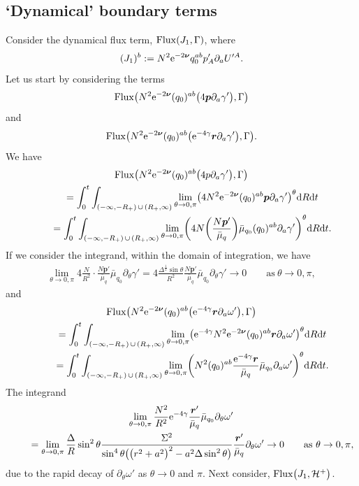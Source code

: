 \documentclass[pdftex]{sigma}
\def\ptl{\partial}%
\def\mbo#1{\boldsymbol{#1}}%
\def\halb{\frac{1}{2}}%
\numberwithin{equation}{section}
\begin{document}
\subsection*{`Dynamical' boundary terms}
Consider the dynamical flux term, ${\rm Flux} (J_1, \Gamma)$, where
\[
(J_1)^b := N^2 {\rm e}^{-2 \mbo{\nu}} q^{ab}_0 p'_A \ptl_a U'^A.
\]
Let us start by considering the terms
\[
{\rm Flux} \bigl(N^2 {\rm e}^{-2 \mbo{\nu}} (q_0)^{ab} \bigl(4 \mbo{p} \ptl_a \gamma' \bigr), \Gamma\bigr)
\]
 and
 \[
 {\rm Flux} \bigl(N^2 {\rm e}^{-2 \mbo{\nu}} (q_0)^{ab} \bigl({\rm e}^{-4 \gamma} \mbo{r} \ptl_a \gamma' \bigr), \Gamma\bigr).
 \]
We have
\begin{gather*}
{\rm Flux} \bigl(N^2 {\rm e}^{-2 \mbo{\nu}} (q_0)^{ab} \bigl(4p \ptl_a \gamma' \bigr), \Gamma\bigr) \\
\qquad{} = \int^t_0 \int_{ (-\infty, -R_+) \, \cup\, (R_+, \infty) } \lim_{\theta \to 0, \pi} \bigl(4 N^2 {\rm e}^{-2 \mbo{\nu}} (q_0)^{ab} \mbo{p} \ptl_a \gamma'\bigr)^\theta {\rm d}R {\rm d}t \notag\\
\qquad{}= \int^t_0 \int_{ (-\infty, -R_+) \, \cup\, (R_+, \infty) } \lim_{\theta \to 0, \pi} \biggl(4 N \biggl(\frac{ N\mbo{p}'}{\bar{\mu}_q} \biggr) \bar{\mu}_{q_0} (q_0)^{ab} \ptl_a \gamma' \biggr)^\theta {\rm d}R {\rm d}t. \notag
 \end{gather*}
If we consider the integrand, within the domain of integration, we have
 \begin{gather*}
 \lim_{\theta \to 0, \pi}4 \frac{N}{R^2} \cdot \frac{N \mbo{p}'}{\bar{\mu}_q} \bar{\mu}_{q_0} \ptl_\theta \gamma' = 4 \frac{\Delta^\halb \sin \theta}{R^2} \frac{N \mbo{p}'}{\bar{\mu}_q} \bar{\mu}_{q_0} \ptl_\theta \gamma'
 \to 0 \qquad \text{as} \ \theta \to 0, \pi,
\end{gather*}
and
\begin{gather*}
 {\rm Flux} \bigl(N^2 {\rm e}^{-2 \mbo{\nu}} (q_0)^{ab} \bigl({\rm e}^{-4 \gamma} \mbo{r} \ptl_a \omega' \bigr), \Gamma\bigr) \\
 \qquad{}= \int^t_0 \int_{ (-\infty, -R_+) \, \cup\, (R_+, \infty) } \lim_{\theta \to 0, \pi} \bigl( {\rm e}^{-4\gamma } N^2 {\rm e}^{-2 \mbo{\nu}} (q_0)^{ab} \mbo{r} \ptl_a \omega' \bigr)^\theta {\rm d}R {\rm d}t \notag\\
 \qquad{}= \int^t_0 \int_{ (-\infty, -R_+) \, \cup\, (R_+, \infty) } \lim_{\theta \to 0, \pi} \biggl( N^2 (q_0)^{ab} \frac{{\rm e}^{-4\gamma }\mbo{r}}{\bar{\mu}_q} \bar{\mu}_{q_0}\ptl_a \omega' \biggr)^\theta {\rm d}R {\rm d}t.
 \end{gather*}
The integrand
\begin{gather*}
 \lim_{\theta \to 0, \pi} \frac{N^2}{R^2} {\rm e}^{-4\gamma} \frac{\mbo{r}'}{\bar{\mu}_q} \bar{\mu}_{q_0} \ptl_\theta \omega' \notag\\
 \qquad{}= \lim_{\theta \to 0, \pi} \frac{\Delta}{R} \sin^2 \theta\frac{\Sigma^2}{\sin^4 \theta \bigl(\bigl(r^2+a^2\bigr)^2 -a^2 \Delta \sin^2 \theta\bigr)} \frac{\mbo{r}'}{\bar{\mu}_q} \ptl_\theta \omega'
 \to 0 \qquad \text{as} \ \theta \to 0, \pi,
\end{gather*}
due to the rapid decay of $\ptl_\theta \omega'$ as $\theta \to 0$ and $\pi$.
Next consider, ${\rm Flux} \bigl(J_1, \mathcal{H}^+\bigr)$.
\end{document}
